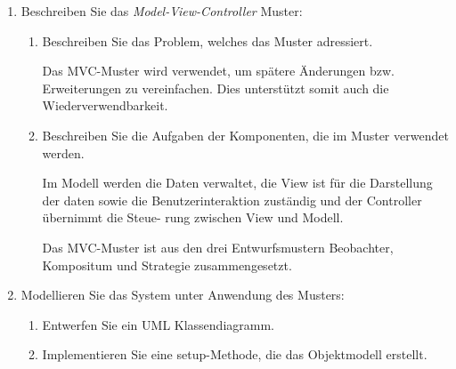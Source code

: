 \documentclass{bschlangaul-aufgabe}
\begin{document}
\begin{enumerate}


\item Beschreiben Sie das \emph{Model-View-Controller} Muster:

\begin{enumerate}


\item Beschreiben Sie das Problem, welches das Muster adressiert.

\begin{bAntwort}
Das MVC-Muster wird verwendet, um spätere Änderungen bzw. Erweiterungen
zu vereinfachen. Dies unterstützt somit auch die Wiederverwendbarkeit.
\end{bAntwort}


\item Beschreiben Sie die Aufgaben der Komponenten, die im Muster
verwendet werden.

\begin{bAntwort}
Im Modell werden die Daten verwaltet, die View ist für die Darstellung
der daten sowie die Benutzerinteraktion zuständig und der Controller
übernimmt die Steue- rung zwischen View und Modell.

Das MVC-Muster ist aus den drei Entwurfsmustern Beobachter, Kompositum
und Strategie zusammengesetzt.
\end{bAntwort}

\end{enumerate}


\item Modellieren Sie das System unter Anwendung des Musters:

\begin{enumerate}


\item Entwerfen Sie ein UML Klassendiagramm.


\item Implementieren Sie eine setup-Methode, die das Objektmodell
erstellt.
\end{enumerate}

\end{enumerate}
\end{document}
